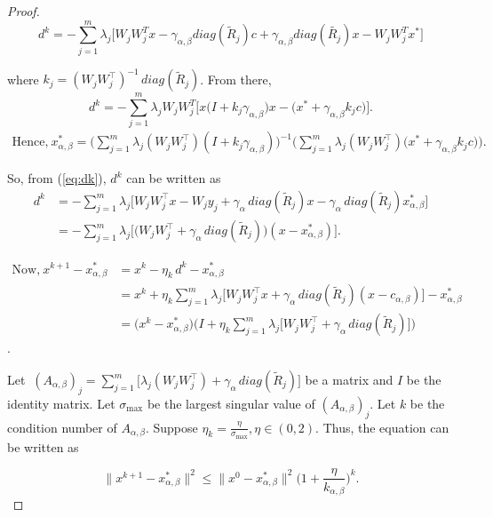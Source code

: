 \documentclass[smallextended,referee,envcountsect]{svjour3}
\begin{document}
\begin{proof}
\[
d^k = -\sum_{j=1}^{m} \lambda_j \Big[W_j W_j^T x -\gamma_{\alpha, \beta}  diag(\tilde{R}_j) c + \gamma_{\alpha, \beta}  diag (\tilde{R_j})x- W_jW_j^T x^{*}\Big]
\]

\noindent where $k_j = (W_j W_j^\top)^{-1} \,  diag(\tilde{R}_j)$. From there,
\[
d^k = -\sum_{j=1}^{m} \lambda_j W_j W_j^T \Big[x \Big(I+k_j \gamma_{\alpha, \beta}\Big)x -\Big(x^* + \gamma_{\alpha, \beta} k_j  c \Big)\Big]
.\]
\begin{align*}
\text{Hence,}~x^*_{\alpha, \beta} = \Big( \sum_{j=1}^{m} \lambda_j (W_j W_j^\top) (I + k_j \gamma_{\alpha ,\beta}) \Big)^{-1} 
\Big( \sum_{j=1}^{m} \lambda_j (W_j W_j^\top) \Big( x^* + \gamma_{\alpha ,\beta} k_j c \Big) \Big).
\end{align*}

So, from (\ref{eq:dk}), $d^k$ can be written as
\begin{align*}
d^k& = -\sum_{j=1}^{m} \lambda_j \Big[ W_j W_j^\top x - W_j  {y}_j + \gamma_\alpha \,  diag(\tilde{R}_j) x - \gamma_\alpha \,  diag(\tilde{R}_j) x_{\alpha,\beta}^* \Big]\\
&= - \sum_{j=1}^{m} \lambda_j \Big[ \Big( W_j W_j^\top + \gamma_\alpha \, diag(\tilde{R}_j) \Big)(x - x_{\alpha,\beta}^{*}) \Big].
\end{align*}

\begin{flushleft}

\begin{align*}
\text{Now,}~x^{k+1} - x^*_{\alpha, \beta} 
&= x^k - \eta_k \, d^k - x^*_{\alpha, \beta} \\
&= x^k + \eta_k \sum_{j=1}^{m} \lambda_j \Big[ W_j W_j^\top x + \gamma_\alpha \, diag(\tilde{R}_j)(x-c_{\alpha, \beta}) \Big] - x^*_{\alpha, \beta} \\
&= \Big( x^k - x^{*}_{\alpha,\beta} \Big) \Big( I + \eta_k \sum_{j=1}^{m} \lambda_j \Big[ W_j W_j^\top + \gamma_\alpha \, diag(\tilde{R}_j) \Big] \Big)
\end{align*}.
\end{flushleft}


Let $~(A_{\alpha,\beta})_j = \sum_{j=1}^{m} \Big[ \lambda_j (W_j W_j^\top) + \gamma_\alpha \, diag(\tilde{R}_j) \Big]$ be a matrix and $I$ be the identity matrix. Let $\sigma_{\max}$ be the largest singular value of $(A_{\alpha,\beta})_j$. Let $k$ be the condition number of $A_{\alpha,\beta}$. Suppose $\eta_k = \frac{\eta}{\sigma_{\max}}, \eta \in (0,2)$. Thus, the equation can be written as

\[
\|x^{k+1} - x_{\alpha,\beta}^{*} \|^2 \leq \|x^{0} - x_{\alpha,\beta}^{*} \|^2 \Big(1 + \frac{\eta}{k_{\alpha,\beta}}\Big)^k.
\]



\end{proof}
\end{document}

